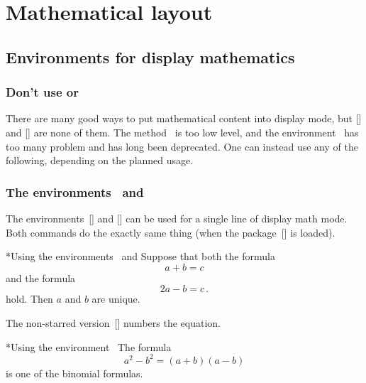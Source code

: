 \chapter{Mathematical layout}





\section{Environments for display mathematics}
\label{display environments}



\subsection{Don’t use \inlinecodetitle{\$\$  \$\$} or }

There are many good ways to put mathematical content into display mode, but \inlinecode{\$\$~\$\$}[\inlinecode] and [\envname] are none of them.
The method~\inlinecode{\$\$  \$\$} is too low level, and the environment~ has too many problem and has long been deprecated.
One can instead use any of the following, depending on the planned usage.



\subsection{The environments~\inlinecodetitle{{\tbs}[ {\tbs}]} and }

The environments~\inlinecode{{\tbs}[ {\tbs}]}[\inlinecode] and [\envname] can be used for a single line of display math mode.
Both commands do the exactly same thing (when the package~[\packname] is loaded).
\begin{showlatex}*{Using the environments~\inlinecode{{\tbs}[ {\tbs}]} and }
Suppose that both the formula
\[
  a + b = c
\]
and the formula
\begin{equation*}
  2a - b = c \,.
\end{equation*}
hold.
Then $a$ and $b$ are unique.
\end{showlatex}
The non-starred version~[\envname] numbers the equation.
\begin{showlatex}*{Using the environment~}
The formula
\begin{equation}
  a^2 - b^2 = (a + b)(a - b)
\end{equation}
is one of the binomial formulas.
\end{showlatex}



